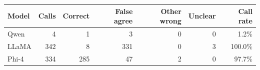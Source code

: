 \begin{tabular}{@{}lrrrrrr@{}}
\toprule
Model & Calls & Correct & False agree & Other wrong & Unclear & Call rate \\
\midrule
Qwen & 4 & 1 & 3 & 0 & 0 & 1.2\% \\
LLaMA & 342 & 8 & 331 & 0 & 3 & 100.0\% \\
Phi-4 & 334 & 285 & 47 & 2 & 0 & 97.7\% \\
\bottomrule
\end{tabular}